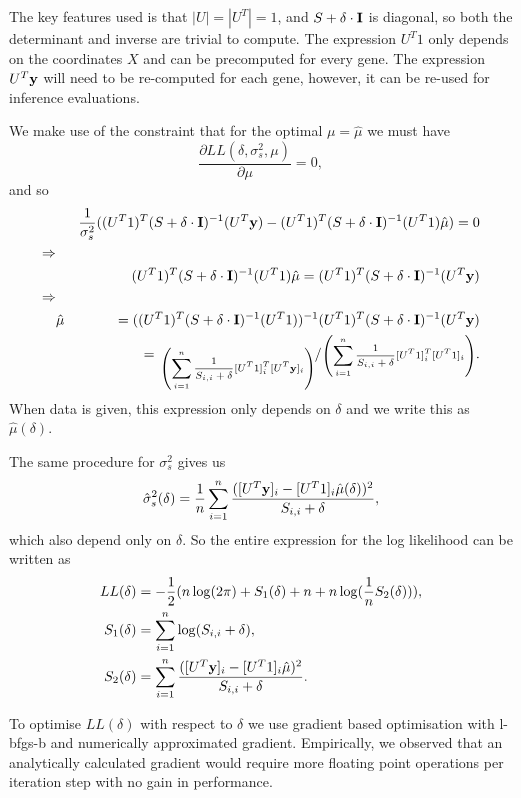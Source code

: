 The key features used is that \( |U| = |U^T| = 1 \), and \( S + \delta \cdot {\bf I} \) is diagonal, so both the determinant and inverse are trivial to compute. The expression \( U^T1 \) only depends on the coordinates \( X \) and can be precomputed for every gene.
The expression \( U^T{\bf y} \) will need to be re-computed for each gene, however, it can be re-used for inference evaluations.

We make use of the constraint that for the optimal \( \mu = \hat{\mu} \) we must have 
\[
\frac{\partial LL(\delta, \sigma_s^2, \mu)}{\partial \mu} = 0,
\] and so
\begin{align*}
& & \frac{1}{\sigma_s^2}( (U^T1)^T (S + \delta \cdot {\bf I} )^{-1} (U^T{\bf y}) - (U^T1)^T (S + \delta \cdot {\bf I})^{-1} (U^T1) \hat{\mu}) = 0 \\
\Rightarrow & & \\
& & (U^T1)^T (S + \delta \cdot {\bf I})^{-1} (U^T1) \hat{\mu} = (U^T1)^T (S + \delta \cdot {\bf I})^{-1} (U^T{\bf y}) \\
\Rightarrow & & \\
&\hat{\mu} &= ((U^T1)^T (S + \delta \cdot {\bf I})^{-1} (U^T1))^{-1} (U^T1)^T (S + \delta \cdot {\bf I})^{-1} (U^T{\bf y}) \\
& &= \sfrac{\left( \sum_{i=1}^n \frac{1}{S_{i,i} + \delta} [U^T1]_i^T [U^T{\bf y}]_i \right)}{\left( \sum_{i=1}^n \frac{1}{S_{i,i} + \delta} [U^T1]_i^T [U^T1]_i \right)}.
\end{align*}
When data is given, this expression only depends on \( \delta \) and we write this as \( \hat{\mu}(\delta) \).

The same procedure for \( \sigma_s^2 \) gives us
\begin{align*}
    \hat{\sigma}_s^2(\delta) = \frac{1}{n} \sum_{i=1}^n \frac{([U^T{\bf y}]_i - [U^T1]_i \hat{\mu}(\delta))^2}{S_{i,i} + \delta},
\end{align*}
which also depend only on \( \delta \). So the entire expression for the log likelihood can be written as
\begin{align*}
    LL(\delta) &= -\frac{1}{2}( n \log (2 \pi) + S_1(\delta) + n + n \log ( \frac{1}{n} S_2(\delta))), \\
    S_1(\delta) &= \sum_{i=1}^n \log (S_{i, i} + \delta), \\
    S_2(\delta) &= \sum_{i=1}^n \frac{([U^T{\bf y}]_i - [U^T1]_i \hat{\mu})^2}{S_{i,i} + \delta}.
\end{align*}

To optimise \( LL(\delta) \) with respect to \( \delta \)  we use gradient based optimisation with l-bfgs-b and numerically approximated gradient. Empirically, we observed that an analytically calculated gradient would require more floating point operations per iteration step with no gain in performance.

